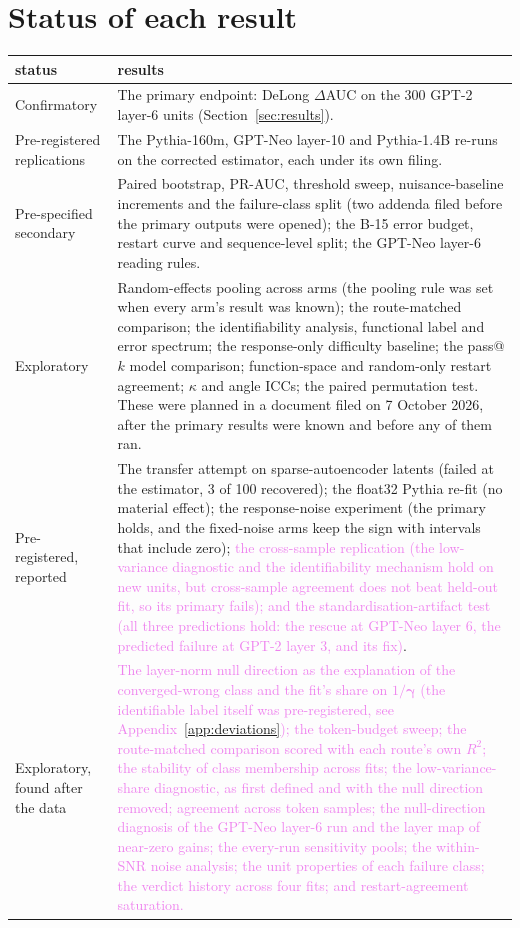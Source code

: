 \documentclass[10pt]{article}
\newcommand{\draft}[1]{\textcolor{violet}{#1}}
\begin{document}
\FloatBarrier
\section{Status of each result}
\label{app:status}
\begin{table}[h]
\centering
\scriptsize
\begin{tabular}{p{2.6cm}p{11cm}}
\toprule
status & results \\
\midrule
Confirmatory & The primary endpoint: DeLong $\Delta$AUC on the 300 GPT-2 layer-6 units
(Section~\ref{sec:results}). \\
Pre-registered replications & The Pythia-160m, GPT-Neo layer-10 and Pythia-1.4B re-runs on the
corrected estimator, each under its own filing. \\
Pre-specified secondary & Paired bootstrap, PR-AUC, threshold sweep, nuisance-baseline
increments and the failure-class split (two addenda filed before the primary outputs were
opened); the B-15 error budget, restart curve and sequence-level split; the GPT-Neo layer-6
reading rules. \\
Exploratory & Random-effects pooling across arms (the pooling rule was set when every arm's
result was known); the route-matched comparison; the identifiability analysis, functional label
and error spectrum; the response-only difficulty baseline; the pass@$k$ model comparison;
function-space and random-only restart agreement; $\kappa$ and angle ICCs; the paired
permutation test. These were planned in a document filed on 7 October 2026, after the primary
results were known and before any of them ran. \\
Pre-registered, reported & The transfer attempt on sparse-autoencoder latents (failed at the
estimator, 3 of 100 recovered); the float32 Pythia re-fit (no material effect); the
response-noise experiment (the primary holds, and the fixed-noise arms keep the sign with
intervals that include zero); \draft{the cross-sample replication (the low-variance diagnostic
and the identifiability mechanism hold on new units, but cross-sample agreement does not beat
held-out fit, so its primary fails); and the standardisation-artifact test (all three predictions hold:
the rescue at GPT-Neo layer 6, the predicted failure at GPT-2 layer 3, and its fix)}. \\
Exploratory, found after the data & \draft{The layer-norm null direction as the explanation of
the converged-wrong class and the fit's share on $1/\boldsymbol{\gamma}$ (the identifiable label
itself was pre-registered, see Appendix~\ref{app:deviations}); the token-budget sweep; the
route-matched comparison scored with each route's own $R^2$; the stability of class membership
across fits; the low-variance-share diagnostic, as first defined and with the null direction
removed; agreement across token samples; the null-direction diagnosis of the GPT-Neo layer-6
run and the layer map of near-zero gains; the every-run sensitivity pools; the within-SNR noise
analysis; the unit properties of each failure class; the verdict history across four fits; and
restart-agreement saturation.} \\
\bottomrule
\end{tabular}
\end{table}
\end{document}
